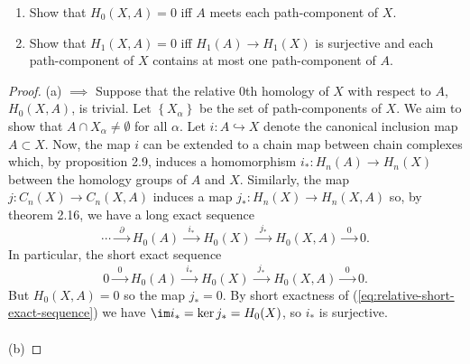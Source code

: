 \begin{problem}[Hatcher {\S}2.1, Ex.\,16]
\begin{enumerate}[label=(\alph*)]
\item Show that $H_0(X,A)=0$ iff $A$ meets each path-component of $X$.
\item Show that $H_1(X,A)=0$ iff $H_1(A)\to H_1(X)$ is surjective and each
  path-component of $X$ contains at most one path-component of $A$.
\end{enumerate}
\end{problem}
\begin{proof}
(a) $\implies$ Suppose that the relative $0$th homology of $X$ with respect
to $A$, $H_0(X,A)$, is trivial. Let $\left\{X_\alpha\right\}$ be the set of
path-components of $X$. We aim to show that $A\cap X_\alpha\neq\emptyset$
for all $\alpha$. Let $i\colon A\hookrightarrow X$ denote the canonical
inclusion map $A\subset X$. Now, the map $i$ can be extended to a chain map
between chain complexes which, by proposition 2.9, induces a homomorphism
$i_*\colon H_n(A)\to H_n(X)$ between the homology groups of $A$ and
$X$. Similarly, the map $j\colon C_n(X)\to C_n(X,A)$ induces a map
$j_*\colon H_n(X)\to H_n(X,A)$ so, by theorem 2.16, we have a long exact
sequence
\begin{equation}
\label{eq:relative-long-exact-sequence}
\cdots\xrightarrow{\;\;\partial\;\;}
H_0(A)\xrightarrow{\;\;i_*\;\;}
H_0(X)\xrightarrow{\;\;j_*\;\;}
H_0(X,A)\xrightarrow{\;\;0\;\;}
0.
\end{equation}
In particular, the short exact sequence
\begin{equation}
\label{eq:relative-short-exact-sequence}
0\xrightarrow{\;\;0\;\;}
H_0(A)\xrightarrow{\;\;i_*\;\;}
H_0(X)\xrightarrow{\;\;j_*\;\;}
H_0(X,A)\xrightarrow{\;\;0\;\;}
0.
\end{equation}
But $H_0(X,A)=0$ so the map $j_*=0$. By short exactness of
(\ref{eq:relative-short-exact-sequence}) we have $\im i_*=\ker j_*=H_0(X)$,
so $i_*$ is surjective.
\\\\
(b)
\end{proof}
\newpage

